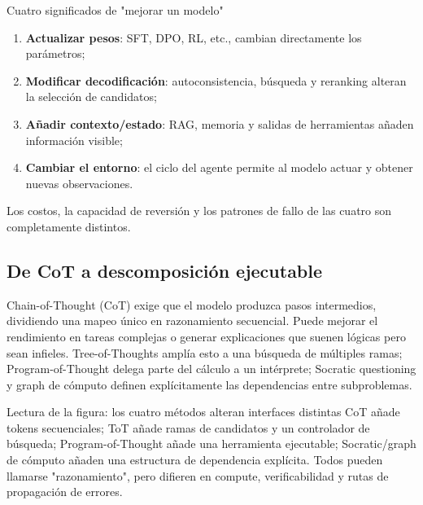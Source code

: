 \begin{importantbox}{Cuatro significados de "mejorar un modelo"}
\begin{enumerate}
  \item \textbf{Actualizar pesos}: SFT, DPO, RL, etc., cambian directamente los parámetros;
  \item \textbf{Modificar decodificación}: autoconsistencia, búsqueda y reranking alteran la selección de candidatos;
  \item \textbf{Añadir contexto/estado}: RAG, memoria y salidas de herramientas añaden información visible;
  \item \textbf{Cambiar el entorno}: el ciclo del agente permite al modelo actuar y obtener nuevas observaciones.
\end{enumerate}
Los costos, la capacidad de reversión y los patrones de fallo de las cuatro son completamente distintos.
\end{importantbox}

\subsection{De CoT a descomposición ejecutable}

Chain-of-Thought (CoT) exige que el modelo produzca pasos intermedios, dividiendo una mapeo único en razonamiento secuencial. Puede mejorar el rendimiento en tareas complejas o generar explicaciones que suenen lógicas pero sean infieles. Tree-of-Thoughts amplía esto a una búsqueda de múltiples ramas; Program-of-Thought delega parte del cálculo a un intérprete; Socratic questioning y graph de cómputo definen explícitamente las dependencias entre subproblemas.





\begin{knowledgebox}{Lectura de la figura: los cuatro métodos alteran interfaces distintas}
CoT añade tokens secuenciales; ToT añade ramas de candidatos y un controlador de búsqueda; Program-of-Thought añade una herramienta ejecutable; Socratic/graph de cómputo añaden una estructura de dependencia explícita. Todos pueden llamarse "razonamiento", pero difieren en compute, verificabilidad y rutas de propagación de errores.
\end{knowledgebox}

